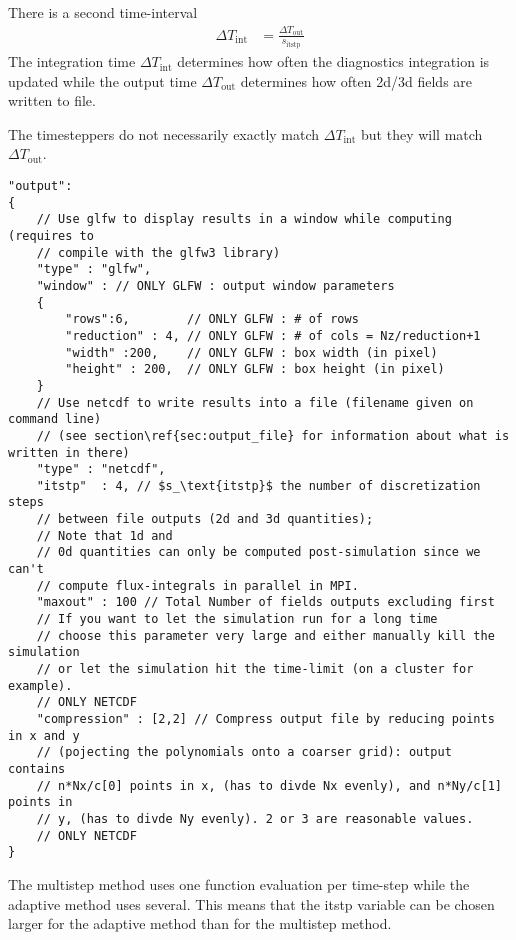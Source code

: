 There is a second time-interval
\begin{align}
    \Delta T_\text{int} &= \frac{\Delta T_\text{out} }{ s_\text{itstp}}
\end{align}
The integration time $\Delta T_\text{int}$ determines how often the diagnostics integration is updated
while the output time $\Delta T_\text{out}$ determines how often 2d/3d fields are written to file.
\begin{tcolorbox}[title=Note]
    The timesteppers do not necessarily exactly match
    $\Delta T_\text{int}$ but they will match $\Delta T_\text{out}$.
\end{tcolorbox}
\begin{verbatim}
"output":
{
    // Use glfw to display results in a window while computing (requires to
    // compile with the glfw3 library)
    "type" : "glfw",
    "window" : // ONLY GLFW : output window parameters
    {
        "rows":6,        // ONLY GLFW : # of rows
        "reduction" : 4, // ONLY GLFW : # of cols = Nz/reduction+1
        "width" :200,    // ONLY GLFW : box width (in pixel)
        "height" : 200,  // ONLY GLFW : box height (in pixel)
    }
    // Use netcdf to write results into a file (filename given on command line)
    // (see section\ref{sec:output_file} for information about what is written in there)
    "type" : "netcdf",
    "itstp"  : 4, // $s_\text{itstp}$ the number of discretization steps
    // between file outputs (2d and 3d quantities);
    // Note that 1d and
    // 0d quantities can only be computed post-simulation since we can't
    // compute flux-integrals in parallel in MPI.
    "maxout" : 100 // Total Number of fields outputs excluding first
    // If you want to let the simulation run for a long time
    // choose this parameter very large and either manually kill the simulation
    // or let the simulation hit the time-limit (on a cluster for example).
    // ONLY NETCDF
    "compression" : [2,2] // Compress output file by reducing points in x and y
    // (pojecting the polynomials onto a coarser grid): output contains
    // n*Nx/c[0] points in x, (has to divde Nx evenly), and n*Ny/c[1] points in
    // y, (has to divde Ny evenly). 2 or 3 are reasonable values.
    // ONLY NETCDF
}
\end{verbatim}
\begin{tcolorbox}[title=Note]
    The multistep method uses one function evaluation per time-step while the
    adaptive method uses several. This means that the itstp variable can
    be chosen larger for the adaptive method than for the multistep method.
\end{tcolorbox}


